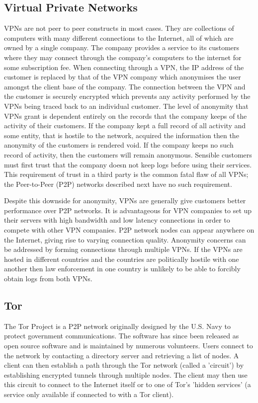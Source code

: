 \documentclass[ %
                    author={Luke Murray},
                supervisor={Dr. Simon Hollis},
                     title={Shadow Peer-to-Peer Networks},
                  subtitle={},
                    degree={MEng},
                      year={2013} ]{thesis}
\begin{document}
\subsection{Virtual Private Networks}

VPNs are not peer to peer constructs in most cases. They are collections of computers with many different connections to the Internet, all of which are owned by a single company. The company provides a service to its customers where they may connect through the company's computers to the internet for some subscription fee. When connecting through a VPN, the IP address of the customer is replaced by that of the VPN company which anonymises the user amongst the client base of the company. The connection between the VPN and the customer is securely encrypted which prevents any activity performed by the VPNs being traced back to an individual customer. The level of anonymity that VPNs grant is dependent entirely on the records that the company keeps of the activity of their customers. If the company kept a full record of all activity and some entity, that is hostile to the network, acquired the information then the anonymity of the customers is rendered void. If the company keeps no such record of activity, then the customers will remain anonymous. Sensible customers must first trust that the company doesn not keep logs before using their services. This requirement of trust in a third party is the common fatal flaw of all VPNs; the Peer-to-Peer (P2P) networks described next have no such requirement.

Despite this downside for anonymity, VPNs are generally give customers better performance over P2P networks. It is advantageous for VPN companies to set up their servers with high bandwidth and low latency connections in order to compete with other VPN companies. P2P network nodes can appear anywhere on the Internet, giving rise to varying connection quality. Anonymity concerns can be addressed by forming connections through multiple VPNs. If the VPNs are hosted in different countries and the countries are politically hostile with one another then law enforcement in one country is unlikely to be able to forcibly obtain logs from both VPNs.

\subsection{Tor}

The Tor Project\cite{Tor} is a P2P network originally designed by the U.S. Navy to protect government communications. The software has since been released as open source software and is maintained by numerous volunteers. Users connect to the network by contacting a directory server and retrieving a list of nodes. A client can then establish a path through the Tor network (called a 'circuit') by establishing encrypted tunnels through multiple nodes. The client may then use this circuit to connect to the Internet itself or to one of Tor's 'hidden services' (a service only available if connected to with a Tor client).
\end{document}
